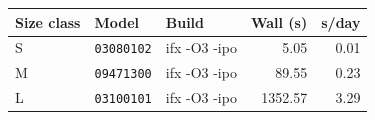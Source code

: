 \begin{tabular*}{\textwidth}{@{\extracolsep{\fill}}lllrr@{}}
\toprule
Size class & Model & Build & Wall (s) & s/day \\
\midrule
S & \texttt{03080102} & ifx -O3 -ipo & 5.05 & 0.01 \\
M & \texttt{09471300} & ifx -O3 -ipo & 89.55 & 0.23 \\
L & \texttt{03100101} & ifx -O3 -ipo & 1352.57 & 3.29 \\
\bottomrule
\end{tabular*}
